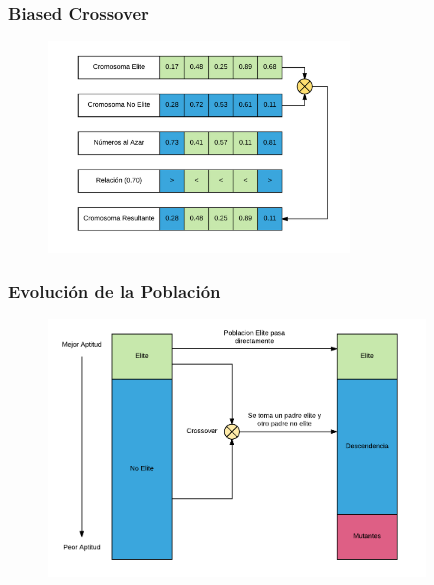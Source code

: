 \documentclass{beamer}
\begin{document}

\begin{frame}
\frametitle{Biased Crossover}

\begin{figure}[h]
	\centering
	\includegraphics[width=8cm]{BiasCrossover}
	\label{fig:BiasCrossover}
\end{figure}

\end{frame}


\begin{frame}
\frametitle{Evolución de la Población}

\begin{figure}[h]
	\centering
	\includegraphics[width=10cm]{EvolucionPoblacion}
	\label{fig:EvolucionPoblacion}
\end{figure}

\end{frame}

\end{document}
